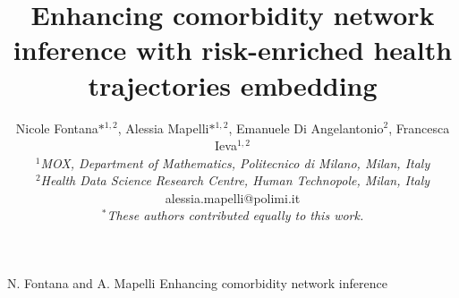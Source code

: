 \documentclass[oupdraft]{bio}
\begin{document}
\title{Enhancing comorbidity network inference with risk-enriched health trajectories embedding}

\author{Nicole Fontana$\ast$$^{1,2}$, Alessia Mapelli$\ast$$^{1,2}$, Emanuele Di Angelantonio$^{2}$, Francesca Ieva$^{1,2}$\\[4pt]
\textit{$^1$MOX, Department of Mathematics, Politecnico di Milano, Milan, Italy}\\
\textit{$^2$Health Data Science Research Centre, Human Technopole, Milan, Italy}
\\[2pt]
{alessia.mapelli@polimi.it}\\
\textit{$^\ast$These authors contributed equally to this work.}}


\markboth%
{N. Fontana and A. Mapelli}
{Enhancing comorbidity network inference }

\maketitle

\end{document}
